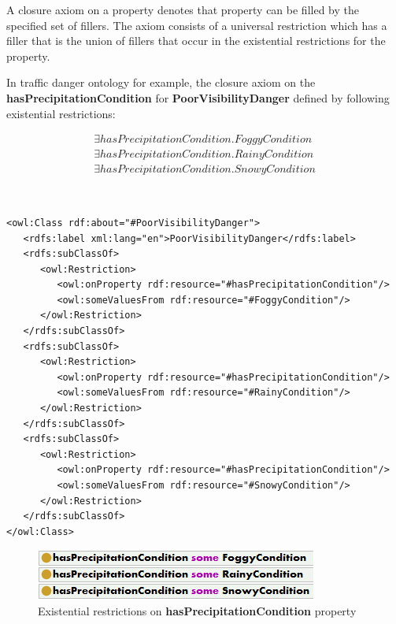 A closure axiom on a property denotes that property can be filled by the specified set of fillers. The axiom consists of a universal restriction which has a filler that is the union of fillers that occur in the existential restrictions for the property.

\newpage

In traffic danger ontology for example, the closure axiom on the \textbf{hasPrecipitationCondition} for \textbf{PoorVisibilityDanger} defined by following existential restrictions:

\[
\begin{array}{l} 
\exists hasPrecipitationCondition. FoggyCondition \\ 
\exists hasPrecipitationCondition. RainyCondition \\
\exists hasPrecipitationCondition. SnowyCondition
\end{array}
\]

\smallskip

{\tt \small
\begin{verbatim}
<owl:Class rdf:about="#PoorVisibilityDanger">
   <rdfs:label xml:lang="en">PoorVisibilityDanger</rdfs:label>
   <rdfs:subClassOf>
      <owl:Restriction>
         <owl:onProperty rdf:resource="#hasPrecipitationCondition"/>
         <owl:someValuesFrom rdf:resource="#FoggyCondition"/>
      </owl:Restriction>
   </rdfs:subClassOf>
   <rdfs:subClassOf>
      <owl:Restriction>
         <owl:onProperty rdf:resource="#hasPrecipitationCondition"/>
         <owl:someValuesFrom rdf:resource="#RainyCondition"/>
      </owl:Restriction>
   </rdfs:subClassOf>
   <rdfs:subClassOf>
      <owl:Restriction>
         <owl:onProperty rdf:resource="#hasPrecipitationCondition"/>
         <owl:someValuesFrom rdf:resource="#SnowyCondition"/>
      </owl:Restriction>
   </rdfs:subClassOf>
</owl:Class>
\end{verbatim}
}

\medskip

\begin{figure}[htp]
\centering
\includegraphics[scale=0.7]{images/chapter3/ClosureAxiomPart1}
\caption{Existential restrictions on \textbf{hasPrecipitationCondition} property}
\label{fig:existentialRestrictions}
\end{figure}

\newpage

